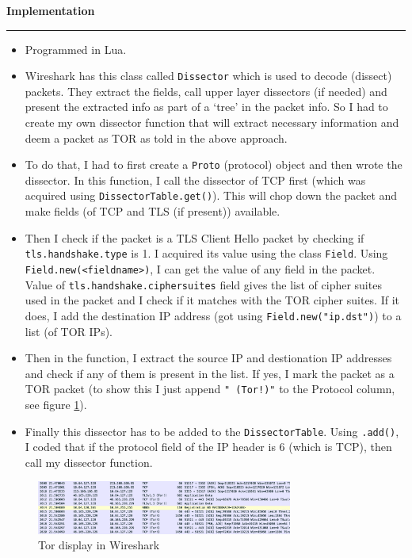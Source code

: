 \documentclass[a4paper,12pt]{article}
\newenvironment{solution}[2][]{%
\begin{mdframed}[linecolor=blue!70!black, linewidth=2pt, roundcorner=10pt, backgroundcolor=yellow!10!white, skipabove=12pt, skipbelow=12pt]%
	\textbf{\large #2}
	\par\noindent\rule{\textwidth}{0.4pt}
}{
\end{mdframed}
}
\begin{document}
\begin{solution}{Implementation}
\begin{itemize}
    \item Programmed in Lua.
    \item Wireshark has this class called \texttt{Dissector} which is used to decode (dissect) packets. They extract the fields, call upper layer dissectors (if needed) and present the extracted info as part of a `tree' in the packet info. So I had to create my own dissector function that will extract necessary information and deem a packet as TOR as told in the above approach.
    \item To do that, I had to first create a \texttt{Proto} (protocol) object and then wrote the dissector. In this function, I call the dissector of TCP first (which was acquired using \texttt{DissectorTable.get()}). This will chop down the packet and make fields (of TCP and TLS (if present)) available.
    \item Then I check if the packet is a TLS Client Hello packet by checking if \texttt{tls.handshake.type} is 1. I acquired its value using the class \texttt{Field}. Using \texttt{Field.new(<fieldname>)}, I can get the value of any field in the packet. Value of \texttt{tls.handshake.ciphersuites} field gives the list of cipher suites used in the packet and I check if it matches with the TOR cipher suites. If it does, I add the destination IP address (got using \texttt{Field.new("ip.dst")}) to a list (of TOR IPs).
    \item Then in the function, I extract the source IP and destionation IP addresses and check if any of them is present in the list. If yes, I mark the packet as a TOR packet (to show this I just append \texttt{" (Tor!)"} to the Protocol column, see figure \ref{tor-display}).
    \item Finally this dissector has to be added to the \texttt{DissectorTable}. Using \texttt{.add()}, I coded that if the protocol field of the IP header is 6 (which is TCP), then call my dissector function.
\end{itemize}
\begin{figure}[H]
    \centering
    \includegraphics[width=0.75\textwidth]{tor-display.png}
    \caption{Tor display in Wireshark}\label{tor-display}
\end{figure}
\end{solution}
\end{document}

